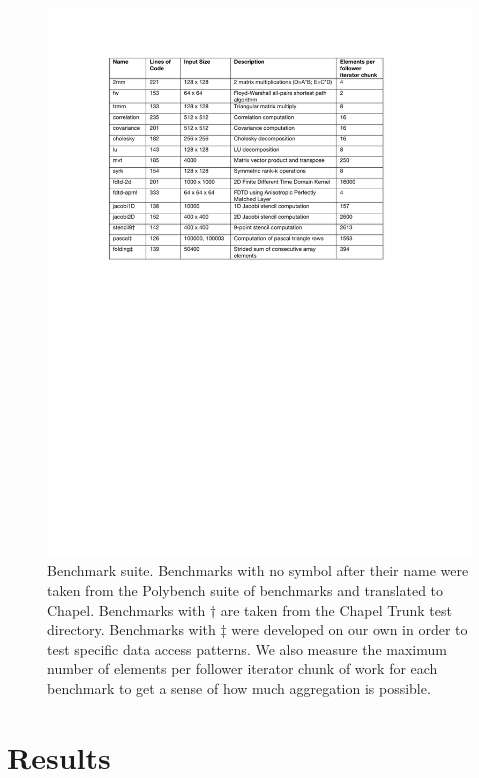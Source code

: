 \begin{figure}
\begin{center}
\includegraphics[scale=0.60]{./Figures/Benchmarks.pdf}
\caption{Benchmark suite. Benchmarks with no symbol after their name were taken from the Polybench suite of benchmarks and translated to Chapel. Benchmarks with $\dagger$ are taken from the Chapel Trunk test directory. Benchmarks with $\ddagger$ were developed on our own in order to test specific data access patterns. We also measure the maximum number of elements per follower iterator chunk of work for each benchmark to get a sense of how much aggregation is possible.}
\label{benchmarks}
\end{center}
\end{figure}

\section{Results}\label{sec:results}

